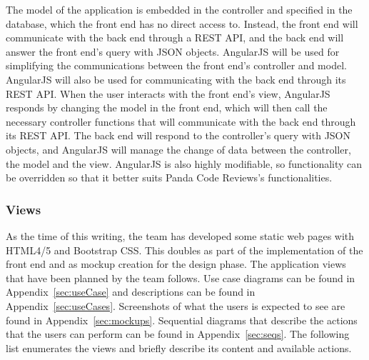 The model of the application is embedded in the controller and specified in the
database, which the front end has no direct access to. Instead, the front end
will communicate with the back end through a REST API, and the back end will
answer the front end's query with JSON objects. AngularJS will be used for
simplifying the communications between the front end's controller and model.
AngularJS will also be used for communicating with the back end through its REST
API. When the user interacts with the front end's view, AngularJS responds by
changing the model in the front end, which will then call the necessary
controller functions that will communicate with the back end through its REST
API. The back end will respond to the controller's query with JSON objects, and
AngularJS will manage the change of data between the controller, the model and
the view. AngularJS is also highly modifiable, so functionality can be
overridden so that it better suits Panda Code Reviews's functionalities.

\subsubsection{Views}

As the time of this writing, the team has developed some static web pages with
HTML4/5 and Bootstrap CSS. This doubles as part of the implementation of the
front end and as mockup creation for the design phase. The application views
that have been planned by the team follows. Use case diagrams can be found in
Appendix~\ref{sec:useCase} and descriptions can be found in
Appendix~\ref{sec:useCases}. Screenshots of what the users is expected to see
are found in Appendix~\ref{sec:mockups}. Sequential diagrams that describe the
actions that the users can perform can be found in Appendix~\ref{sec:seqs}. The
following list enumerates the views and briefly describe its content and
available actions.

